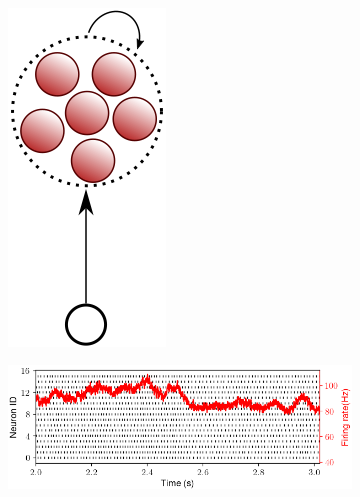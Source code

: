 \begin{figure}[h!]
\begin{subfigure}{.3\textwidth}
    \caption{}
    \label{fig:single_cluster_feedforward_ff_curves}
  \end{subfigure}
  \\
  \begin{subfigure}{.1\textwidth}
    \centering
    \includegraphics[width=.6\textwidth]{img/chapter4/FF_Rec.png}
    \caption{}
    \label{fig:single_cluster_recurrent_sketch}
  \end{subfigure}
    \hfill
  \begin{subfigure}{.5\textwidth}
    \centering
    \includegraphics[width=\textwidth]{img/chapter4/raster_rec.png}

\end{subfigure}
\end{figure}
